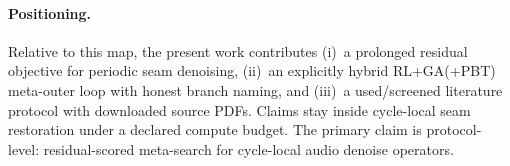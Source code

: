 \paragraph{Positioning.}
Relative to this map, the present work contributes (i)~a prolonged residual objective for periodic seam denoising, (ii)~an explicitly hybrid RL+GA(+PBT) meta-outer loop with honest branch naming, and (iii)~a used/screened literature protocol with downloaded source PDFs.
Claims stay inside cycle-local seam restoration under a declared compute budget.
The primary claim is protocol-level: residual-scored meta-search for cycle-local audio denoise operators.
